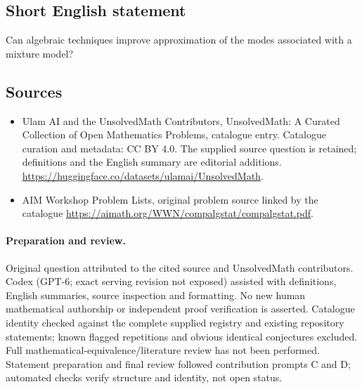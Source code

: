 \documentclass[11pt]{article}
\begin{document}
\subsection{Short English statement}
Can algebraic techniques improve approximation of the modes associated with a mixture model?
\subsection{Sources}
\begin{itemize}
\item[\hypertarget{source:statement:1}{S1}] Ulam AI and the UnsolvedMath Contributors, UnsolvedMath: A Curated Collection of Open Mathematics Problems, catalogue entry. Catalogue curation and metadata: CC BY 4.0. The supplied source question is retained; definitions and the English summary are editorial additions.
\url{https://huggingface.co/datasets/ulamai/UnsolvedMath}.
\item[\hypertarget{source:statement:2}{S2}] AIM Workshop Problem Lists, original problem source linked by the catalogue
\url{https://aimath.org/WWN/compalgstat/compalgstat.pdf}.
\end{itemize}
\paragraph{Preparation and review.}
Original question attributed to the cited source and UnsolvedMath contributors. Codex (GPT-6; exact serving revision not exposed) assisted with definitions, English summaries, source inspection and formatting. No new human mathematical authorship or independent proof verification is asserted. Catalogue identity checked against the complete supplied registry and existing repository statements; known flagged repetitions and obvious identical conjectures excluded. Full mathematical-equivalence/literature review has not been performed. Statement preparation and final review followed contribution prompts C and D; automated checks verify structure and identity, not open status.
\label{end:statement}
\end{document}
